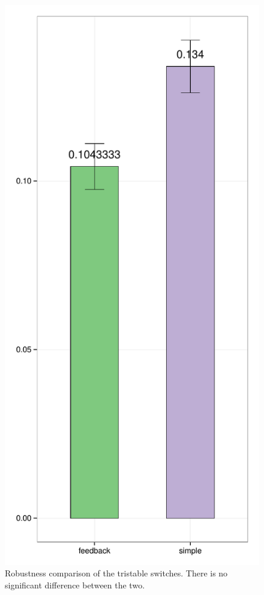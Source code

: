 \begin{figure}[h!]
\begin{center}
\includegraphics[scale=0.4]{chapterModelling/mass_action_stochastic_switches/bi_tri_same_priors/robustness_comparison_tri.pdf}
\caption{Robustness comparison of the tristable switches. There is no significant difference between the two.}\label{fig_4}
\end{center}
\end{figure}
\clearpage

